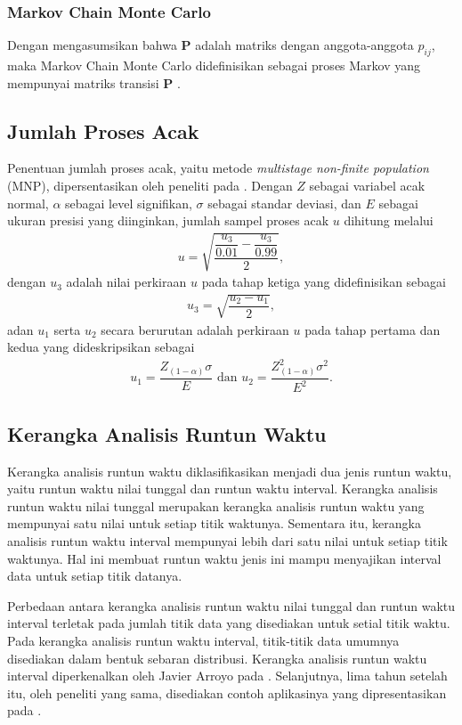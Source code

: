 {{{{{{\subsubsection{Markov Chain Monte Carlo}
Dengan mengasumsikan bahwa $\mathbf{P}$ adalah matriks dengan anggota-anggota $p_{ij}$, maka Markov Chain Monte Carlo didefinisikan sebagai proses Markov yang mempunyai matriks transisi $\mathbf{P}$ \cite{Revuz1984}.

\subsection{Jumlah Proses Acak}
Penentuan jumlah proses acak, yaitu metode \textit{multistage non-finite population} (MNP), dipersentasikan oleh peneliti pada \cite{Louangrath2014}. Dengan $Z$ sebagai variabel acak normal, $\alpha$ sebagai level signifikan, $\sigma$ sebagai standar deviasi, dan $E$ sebagai ukuran presisi yang diinginkan, jumlah sampel proses acak $u$ dihitung melalui
\begin{align}\label{mnp1}
u=\sqrt{\dfrac{\dfrac{u_3}{0.01}-\dfrac{u_3}{0.99}}{2}},
\end{align}
dengan $u_3$ adalah nilai perkiraan $u$ pada tahap ketiga yang didefinisikan sebagai
\begin{align}\label{mnp2}
u_3=\sqrt{\dfrac{u_2-u_1}{2}},
\end{align}
adan $u_1$ serta $u_2$ secara berurutan adalah perkiraan $u$ pada tahap pertama dan kedua yang dideskripsikan sebagai  
\begin{align}\label{mnp3}
	u_1=\dfrac{Z_{(1-\alpha)}\sigma}{E}\text{ dan }u_2=\dfrac{Z_{(1-\alpha)}^2\sigma^2}{E^2}.
\end{align}

\subsection{Kerangka Analisis Runtun Waktu}
Kerangka analisis runtun waktu diklasifikasikan menjadi dua jenis runtun waktu, yaitu runtun waktu nilai tunggal dan runtun waktu interval. Kerangka analisis runtun waktu nilai tunggal merupakan kerangka analisis runtun waktu yang mempunyai satu nilai untuk setiap titik waktunya. Sementara itu, kerangka analisis runtun waktu interval mempunyai lebih dari satu nilai untuk setiap titik waktunya. Hal ini membuat runtun waktu jenis ini mampu menyajikan interval data untuk setiap titik datanya. 

Perbedaan antara kerangka analisis runtun waktu nilai tunggal dan runtun waktu interval terletak pada jumlah titik data yang disediakan untuk setial titik waktu. Pada kerangka analisis runtun waktu interval, titik-titik data umumnya disediakan dalam bentuk sebaran distribusi. Kerangka analisis runtun waktu interval diperkenalkan oleh Javier Arroyo pada \cite{Arroyo2006}. Selanjutnya, lima tahun setelah itu, oleh peneliti yang sama, disediakan contoh aplikasinya yang dipresentasikan pada \cite{Arroyo2011}.

}}}}}}
